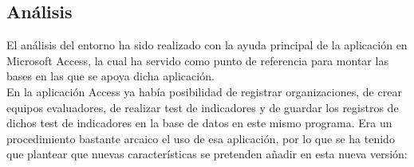 \subsection{Análisis}
El análisis del entorno ha sido realizado con la ayuda principal de la
aplicación en Microsoft Access, la cual ha servido como punto de referencia para
montar las bases en las que se apoya dicha aplicación. 
\\En la aplicación Access ya había posibilidad de registrar organizaciones, de
crear equipos evaluadores, de realizar test de indicadores y de guardar los
registros de dichos test de indicadores en la base de datos en este mismo
programa. Era un procedimiento bastante arcaico el uso de esa aplicación, por lo
que se ha tenido que plantear que nuevas características se pretenden añadir en
esta nueva versión:
